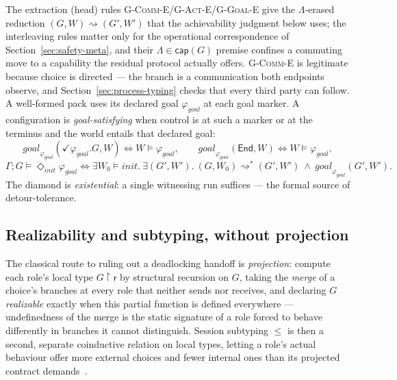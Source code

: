 \documentclass{article}
\theoremstyle{plain}
\theoremstyle{definition}
\newcommand{\reach}{\rightsquigarrow}
\newcommand{\reachs}{\reach^{*}}
\newcommand{\goal}{\mathit{goal}}
\newcommand{\gphi}{\varphi_{\mathit{goal}}}
\newcommand{\restr}[1]{{\restriction}#1}
\newcommand{\achinit}{\vDash\Diamond_{\mathit{init}}}
\newcommand{\cp}[1]{\mathsf{cap}(#1)}
\newcommand{\End}{\mathsf{End}}
\begin{document}
The extraction (head) rules
\textsc{G-Comm-E}/\textsc{G-Act-E}/\textsc{G-Goal-E} give the $\Lambda$-erased
reduction $(G,W)\reach(G',W')$ that the achievability judgment below uses; the
interleaving rules matter only for the operational correspondence of
Section~\ref{sec:safety-meta}, and
their $\Lambda\in\cp G$ premise confines a commuting move to a capability the
residual protocol actually offers. \textsc{G-Comm-E} is legitimate because choice
is directed --- the branch is a communication both endpoints observe, and
Section~\ref{sec:process-typing} checks that every third party can follow. A
well-formed pack uses its declared goal $\gphi$ at each goal marker. A configuration is
\emph{goal-satisfying} when control is at such a marker or at the terminus and
the world entails that declared goal:
\[
\goal_{\gphi}(\checkmark\gphi.G,W)\iff W\vDash\gphi,\qquad
\goal_{\gphi}(\End,W)\iff W\vDash\gphi,
\]
\[
\Gamma;G\achinit\gphi\iff
\exists W_0\vDash\mathit{init}.\ \exists(G',W').\
(G,W_0)\reachs(G',W')\ \wedge\ \goal_{\gphi}(G',W').
\]
The diamond is \emph{existential}: a single witnessing run suffices --- the
formal source of detour-tolerance.

\subsection{Realizability and subtyping, without projection}
\label{sec:no-projection}
The classical route to ruling out a deadlocking handoff is \emph{projection}: compute
each role's local type $G\restr{\mathsf r}$ by structural recursion on $G$, taking
the \emph{merge} of a choice's branches at every role that neither sends nor
receives, and declaring $G$ \emph{realizable} exactly when this partial function is
defined everywhere --- undefinedness of the merge is the static signature of a
role forced to behave differently in branches it cannot distinguish. Session
subtyping $\le$ is then a second, separate coinductive relation on local types,
letting a role's actual behaviour offer more external choices and fewer internal
ones than its projected contract demands~\cite{gayhole,ghilezan,scalasyoshida}.
\end{document}
